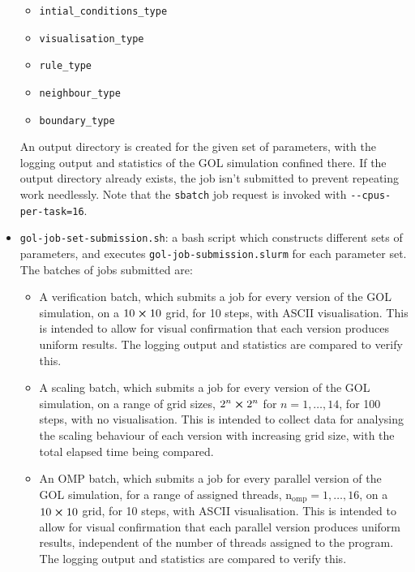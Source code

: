 \documentclass[]{article}
\begin{document}
\begin{itemize}
\begin{itemize}
  \item \lstinline{intial_conditions_type}

  \item \lstinline{visualisation_type}

  \item \lstinline{rule_type}

  \item \lstinline{neighbour_type}

  \item \lstinline{boundary_type}
  \end{itemize}
  An output directory is created for the given set of parameters, with the
  logging output and statistics of the GOL simulation confined there.
  If the output directory already exists, the job isn't submitted to prevent
  repeating work needlessly.
  Note that the \lstinline[style=ff]{sbatch} job request is invoked with
  \lstinline{--cpus-per-task=16}.

\item \lstinline[style=ff]{gol-job-set-submission.sh}: a bash script which
  constructs different sets of parameters, and executes
  \lstinline[style=ff]{gol-job-submission.slurm} for each parameter set.
  The batches of jobs submitted are:
  \begin{itemize}
  \item A verification batch, which submits a job for every version of the GOL
    simulation, on a $10\cross10$ grid, for 10 steps, with ASCII visualisation.
    This is intended to allow for visual confirmation that each version produces
    uniform results.
    The logging output and statistics are compared to verify this.

  \item A scaling batch, which submits a job for every version of the GOL
    simulation, on a range of grid sizes, $2^{n}\cross2^{n}$ for
    $n = 1, \dotsc, 14$, for 100 steps, with no visualisation.
    This is intended to collect data for analysing the scaling behaviour of each
    version with increasing grid size, with the total elapsed time being
    compared.

  \item An OMP batch, which submits a job for every parallel version of the GOL
    simulation, for a range of assigned threads,
    $\mathrm{n_{omp}} = 1, \dotsc, 16$, on a $10\cross10$ grid, for 10 steps,
    with ASCII visualisation.
    This is intended to allow for visual confirmation that each parallel version
    produces uniform results, independent of the number of threads assigned to
    the program.
    The logging output and statistics are compared to verify this.


\end{itemize}
\end{itemize}
\end{document}
